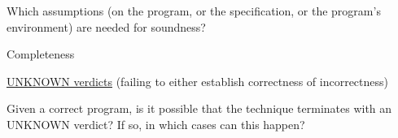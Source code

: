 \documentclass[a4paper]{article}
\begin{document}
\begin{minipage}[t]{0.16\linewidth}
\begin{betterlist}
\begin{betterlist}
\begin{betterlist}
			\end{betterlist}
			\item Which assumptions (on the program, or the specification, or the program’s environment) are needed for soundness?
		\end{betterlist}
		\item \alert{Completeness}
		\begin{betterlist}
			\item \underline{UNKNOWN verdicts} (failing to either establish correctness of incorrectness)
			\begin{betterlist}
				\item Given a correct program, is it possible that the technique terminates with an UNKNOWN verdict? If so, in which cases can this happen?


\end{betterlist}
\end{betterlist}
\end{betterlist}
\end{minipage}
\end{document}
